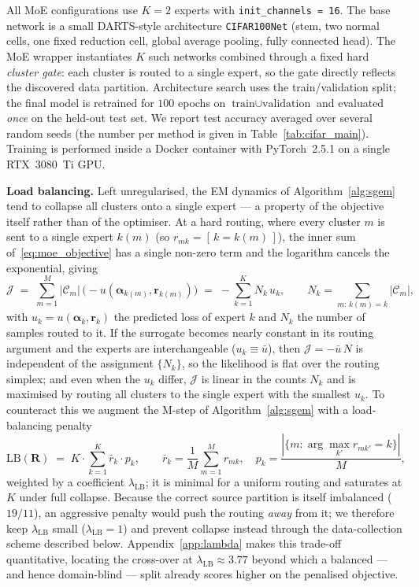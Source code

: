All MoE configurations use $K = 2$ experts with
\texttt{init\_channels = 16}. The base network is a small DARTS-style
architecture \texttt{CIFAR100Net} (stem, two normal cells, one fixed
reduction cell, global average pooling, fully connected head). The MoE
wrapper instantiates $K$ such networks combined through a fixed hard
\emph{cluster gate}: each cluster is routed to a single expert, so the
gate directly reflects the discovered data partition. Architecture
search uses the train/validation split; the final model is retrained
for $100$ epochs on $\text{train} \cup \text{validation}$ and evaluated
\emph{once} on the held-out test set. We report test accuracy averaged
over several random seeds (the number per method is given in
Table~\ref{tab:cifar_main}). Training is performed inside a Docker
container with PyTorch~2.5.1 on a single RTX~3080~Ti GPU.

\textbf{Load balancing.} Left unregularised, the EM dynamics of
Algorithm~\ref{alg:sgem} tend to collapse all clusters onto a single
expert --- a property of the objective itself rather than of the
optimiser. At a hard routing, where every cluster $m$ is sent to a single
expert $k(m)$ (so $r_{mk} = [\,k = k(m)\,]$), the inner sum
of~\eqref{eq:moe_objective} has a single non-zero term and the logarithm
cancels the exponential, giving
\begin{equation}
\label{eq:hard_objective}
\mathcal{J} \;=\; \sum_{m=1}^{M} |\mathcal{C}_m|\,
\bigl(-u(\boldsymbol{\alpha}_{k(m)}, \mathbf{r}_{k(m)})\bigr)
\;=\; -\sum_{k=1}^{K} N_k\, u_k,
\qquad N_k = \!\!\sum_{m:\,k(m)=k}\!\! |\mathcal{C}_m|,
\end{equation}
with $u_k = u(\boldsymbol{\alpha}_k, \mathbf{r}_k)$ the predicted loss of
expert $k$ and $N_k$ the number of samples routed to it. If the surrogate
becomes nearly constant in its routing argument and the experts are
interchangeable ($u_k \equiv \bar u$), then $\mathcal{J} = -\bar u\, N$ is
independent of the assignment $\{N_k\}$, so the likelihood is flat over
the routing simplex; and even when the $u_k$ differ, $\mathcal{J}$ is
linear in the counts $N_k$ and is maximised by routing all clusters to
the single expert with the smallest $u_k$. To counteract this we augment
the M-step of Algorithm~\ref{alg:sgem} with a load-balancing penalty
\begin{equation}
\label{eq:loadbalance}
\mathrm{LB}(\mathbf{R}) \;=\; K \cdot \sum_{k=1}^{K}\bar{r}_k \cdot p_k,
\qquad
\bar{r}_k = \frac{1}{M}\sum_{m=1}^{M} r_{mk}, \quad
p_k = \frac{|\{m : \arg\max_{k'} r_{mk'} = k\}|}{M},
\end{equation}
weighted by a coefficient $\lambda_{\text{LB}}$; it is minimal for a
uniform routing and saturates at $K$ under full collapse. Because the
correct source partition is itself imbalanced ($19/11$), an aggressive
penalty would push the routing \emph{away} from it; we therefore keep
$\lambda_{\text{LB}}$ small ($\lambda_{\text{LB}} = 1$) and prevent
collapse instead through the data-collection scheme described below.
Appendix~\ref{app:lambda} makes this trade-off quantitative, locating
the cross-over at $\lambda_{\text{LB}} \approx 3.77$ beyond which a
balanced --- and hence domain-blind --- split already scores higher on
the penalised objective.

